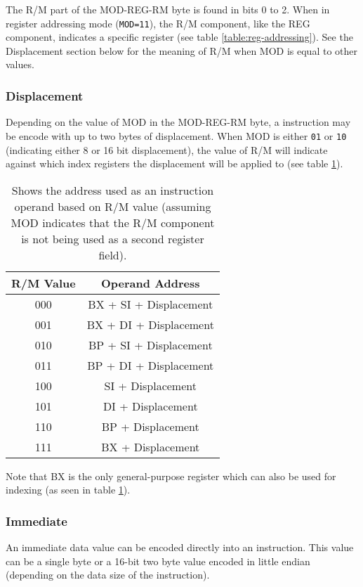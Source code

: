 		The R/M part of the MOD-REG-RM byte is found in bits 0 to 2. When in register addressing mode (\texttt{MOD=11}), the R/M component, like the REG component, indicates a specific register (see table \ref{table:reg-addressing}). See the Displacement section below for the meaning of R/M when MOD is equal to other values.

	\subsubsection{Displacement}
		Depending on the value of MOD in the MOD-REG-RM byte, a instruction may be encode with up to two bytes of displacement. When MOD is either \texttt{01} or \texttt{10} (indicating either 8 or 16 bit displacement), the value of R/M will indicate against which index registers the displacement will be applied to (see table \ref{table:rm-values}).

		\begin{table}[h]
			\centering
			\begin{tabular} { | c | c | }
				\hline
				R/M Value & Operand Address \\
				\hline
				000 & BX + SI + Displacement \\
				001 & BX + DI + Displacement \\
				010 & BP + SI + Displacement \\
				011 & BP + DI + Displacement \\
				100 & SI + Displacement \\
				101 & DI + Displacement \\
				110 & BP + Displacement \\
				111 & BX + Displacement \\
				\hline
			\end{tabular}
			\caption{Shows the address used as an instruction operand based on R/M value (assuming MOD indicates that the R/M component is not being used as a second register field).}
			\label{table:rm-values}
		\end{table}

		Note that BX is the only general-purpose register which can also be used for indexing (as seen in table \ref{table:rm-values}).

	\subsubsection{Immediate}
		An immediate data value can be encoded directly into an instruction. This value can be a single byte or a 16-bit two byte value encoded in little endian (depending on the data size of the instruction).

